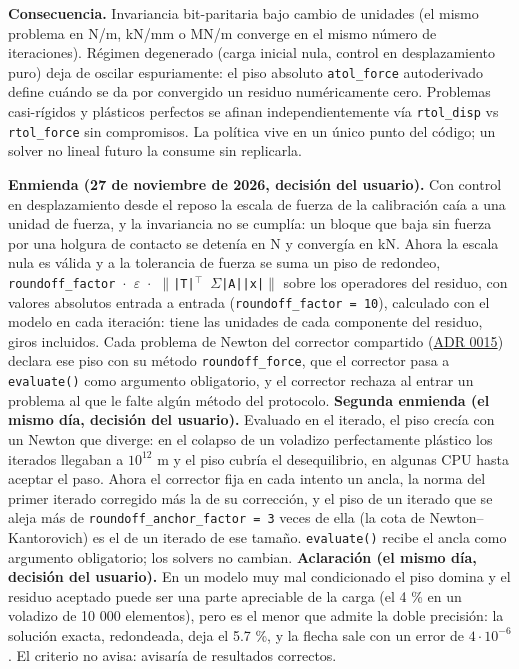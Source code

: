 \documentclass[11pt,oneside]{report}
\begin{document}
\textbf{Consecuencia.} Invariancia bit-paritaria bajo cambio de unidades (el mismo problema en N/m, kN/mm o MN/m converge en el mismo número de iteraciones). Régimen degenerado (carga inicial nula, control en desplazamiento puro) deja de oscilar espuriamente: el piso absoluto \texttt{atol\_force} autoderivado define cuándo se da por convergido un residuo numéricamente cero. Problemas casi-rígidos y plásticos perfectos se afinan independientemente vía \texttt{rtol\_disp} vs \texttt{rtol\_force} sin compromisos. La política vive en un único punto del código; un solver no lineal futuro la consume sin replicarla.

\textbf{Enmienda (27 de noviembre de 2026, decisión del usuario).} Con control en desplazamiento desde el reposo la escala de fuerza de la calibración caía a una unidad de fuerza, y la invariancia no se cumplía: un bloque que baja sin fuerza por una holgura de contacto se detenía en N y convergía en kN. Ahora la escala nula es válida y a la tolerancia de fuerza se suma un piso de redondeo, \texttt{roundoff\_\allowbreak{}factor \ensuremath{\cdot} \ensuremath{\varepsilon} \ensuremath{\cdot} \ensuremath{\|}|T|\ensuremath{^{\top}} \ensuremath{\Sigma}|A||x|\ensuremath{\|}} sobre los operadores del residuo, con valores absolutos entrada a entrada (\texttt{roundoff\_\allowbreak{}factor = 10}), calculado con el modelo en cada iteración: tiene las unidades de cada componente del residuo, giros incluidos. Cada problema de Newton del corrector compartido (\hyperref[adr:0015]{ADR 0015}) declara ese piso con su método \texttt{roundoff\_force}, que el corrector pasa a \texttt{evaluate()} como argumento obligatorio, y el corrector rechaza al entrar un problema al que le falte algún método del protocolo. \textbf{Segunda enmienda (el mismo día, decisión del usuario).} Evaluado en el iterado, el piso crecía con un Newton que diverge: en el colapso de un voladizo perfectamente plástico los iterados llegaban a $10^{12}$ m y el piso cubría el desequilibrio, en algunas CPU hasta aceptar el paso. Ahora el corrector fija en cada intento un ancla, la norma del primer iterado corregido más la de su corrección, y el piso de un iterado que se aleja más de \texttt{roundoff\_\allowbreak{}anchor\_\allowbreak{}factor = 3} veces de ella (la cota de Newton--Kantorovich) es el de un iterado de ese tamaño. \texttt{evaluate()} recibe el ancla como argumento obligatorio; los solvers no cambian. \textbf{Aclaración (el mismo día, decisión del usuario).} En un modelo muy mal condicionado el piso domina y el residuo aceptado puede ser una parte apreciable de la carga (el 4 \% en un voladizo de 10 000 elementos), pero es el menor que admite la doble precisión: la solución exacta, redondeada, deja el 5.7 \%, y la flecha sale con un error de $4\cdot 10^{-6}$. El criterio no avisa: avisaría de resultados correctos.
\end{document}
